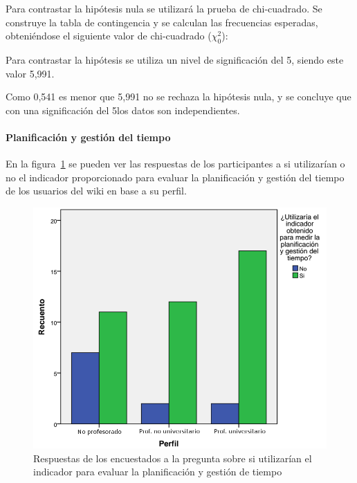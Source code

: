 Para contrastar la hipótesis nula se utilizará la prueba de chi-cuadrado. Se construye la tabla de contingencia y se calculan las frecuencias esperadas, obteniéndose el siguiente valor de chi-cuadrado ($\chi^2_0$): 

\begin{center}
\end{center}

Para contrastar la hipótesis se utiliza un nivel de significación del 5\percentage, siendo este valor 5,991. 

\begin{center}
\end{center}

Como 0,541 es menor que 5,991 no se rechaza la hipótesis nula, y se concluye que con una significación del 5\percentage{ }los datos son independientes.

\begin{center}
\end{center}
 
\paragraph*{Planificación y gestión del tiempo}
 
En la figura~\ref{fig:app:barras:perfil:planificacion} se pueden ver las respuestas de los participantes a si utilizarían o no el indicador proporcionado para evaluar la planificación y gestión del tiempo de los usuarios del wiki en base a su perfil.

\begin{figure}
  \begin{center}
    \includegraphics[scale=0.3]{barras_perfil_planificacion.png}
  \end{center}
  \caption{Respuestas de los encuestados a la pregunta sobre si utilizarían el indicador para evaluar la planificación y gestión de tiempo}
  \label{fig:app:barras:perfil:planificacion}
\end{figure}


